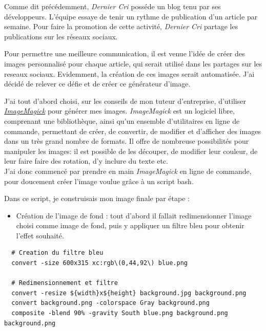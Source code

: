 \documentclass[12pt,a4paper]{article}
\providecommand{\tightlist}{%
  \setlength{\itemsep}{0pt}\setlength{\parskip}{0pt}}
\begin{document}
  \bigskip

  Comme dit précédemment, \emph{Dernier Cri} posséde un blog tenu par ses
  développeurs. L'équipe essaye de tenir un rythme de publication d'un
  article par semaine. Pour faire la promotion de cette activité,
  \emph{Dernier Cri} partage les publications sur les réseaux sociaux.

  \bigskip

  Pour permettre une meilleure communication, il est venue l'idée de créer
  des images personnalisé pour chaque article, qui serait utilisé dans les
  partages sur les reseaux sociaux. Evidemment, la création de ces images
  serait automatisée. J'ai décidé de relever ce défie et de créer ce
  générateur d'image.

  \bigskip

  J'ai tout d'abord choisi, sur les conseils de mon tuteur d'entreprise,
  d'utiliser
  \href{https://www.imagemagick.org/script/index.php}{\emph{ImageMagick}}
  pour générer mes images. \emph{ImageMagick} est un logiciel libre,
  comprenant une bibliothèque, ainsi qu'un ensemble d'utilitaires en ligne
  de commande, permettant de créer, de convertir, de modifier et
  d'afficher des images dans un très grand nombre de formats. Il offre de
  nombreuse possibilités pour manipuler les images: il est possible de les
  découper, de modifier leur couleur, de leur faire faire des rotation,
  d'y inclure du texte etc.\\
  J'ai donc commencé par prendre en main \emph{ImageMagick} en ligne de
  commande, pour doucement créer l'image voulue grâce à un script bash.

  \bigskip

  Dans ce script, je construisais mon image finale par étape :

  \begin{itemize}
  \tightlist
  \item
    Création de l'image de fond : tout d'abord il fallait redimensionner
    l'image choisi comme image de fond, puis y appliquer un filtre bleu
    pour obtenir l'effet souhaité.
  \end{itemize}

  \begin{verbatim}
  # Creation du filtre bleu
  convert -size 600x315 xc:rgb\(0,44,92\) blue.png

  # Redimensionnement et filtre
  convert -resize ${width}x${height} background.jpg background.png
  convert background.png -colorspace Gray background.png
  composite -blend 90% -gravity South blue.png background.png background.png
  \end{verbatim}
\end{document}
